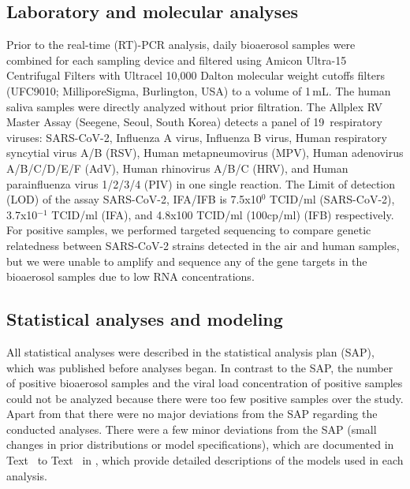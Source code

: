 \documentclass[fleqn,11pt]{wlscirep}
\begin{document}
\subsection{Laboratory and molecular analyses}\label{sec:mol_analyses}

\noindent Prior to the real-time (RT)-PCR analysis, daily bioaerosol samples were combined for each sampling device and filtered using Amicon Ultra-15 Centrifugal Filters with Ultracel 10,000 Dalton molecular weight cutoffs filters (UFC9010; MilliporeSigma, Burlington, USA) to a volume of 1\,mL. The human saliva samples were directly analyzed without prior filtration. The Allplex RV Master Assay (Seegene, Seoul, South Korea) detects a panel of 19~respiratory viruses: SARS-CoV-2, Influenza A virus, Influenza B virus, Human respiratory syncytial virus A/B (RSV), Human metapneumovirus (MPV), Human adenovirus A/B/C/D/E/F (AdV), Human rhinovirus A/B/C (HRV), and Human parainfluenza virus 1/2/3/4 (PIV) in one single reaction. %
The Limit of detection (LOD) of the assay SARS-CoV-2, IFA/IFB is 7.5x10$^0$ TCID/ml (SARS-CoV-2), 3.7x10$^{-1}$ TCID/ml (IFA), and 4.8x100 TCID/ml (100cp/ml) (IFB) respectively.
For positive samples, we performed targeted sequencing to compare genetic relatedness between SARS-CoV-2 strains detected in the air and human samples\cite{Goncalves2021Microorganisms}, but we were unable to amplify and sequence any of the gene targets in the bioaerosol samples due to low RNA concentrations. 

\subsection{Statistical analyses and modeling}

All statistical analyses were described in the statistical analysis plan (SAP)\cite{Banholzer2023SAP}, which was published before analyses began. In contrast to the SAP, the number of positive bioaerosol samples and the viral load concentration of positive samples could not be analyzed because there were too few positive samples over the study. Apart from that there were no major deviations from the SAP regarding the conducted analyses. There were a few minor deviations from the SAP (\eg small changes in prior distributions or model specifications), which are documented in Text~ to Text~ in \supp, which provide detailed descriptions of the models used in each analysis.
\end{document}
